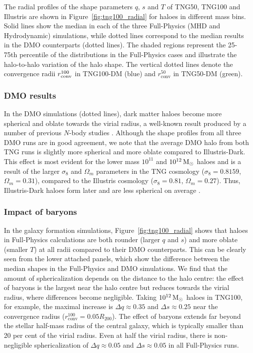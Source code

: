 \documentclass[fleqn,usenatbib]{mnras}
\def\msun{\,\rm M_{\odot}}
\begin{document}
The radial profiles of the shape parameters $q$, $s$ and $T$ of TNG50, TNG100 and Illustris are shown in Figure~\ref{fig:tng100_radial} for haloes in different mass bins.
Solid lines show the median in each of the three Full-Physics (MHD and Hydrodynamic) simulations, while dotted lines correspond to the median results in the DMO counterparts (dotted lines).  
The shaded regions represent the 25-75th percentile of the distributions in the Full-Physics cases and illustrate the halo-to-halo variation of the halo shape.
The vertical dotted lines denote the convergence radii $r_{\rm conv}^{100}$ in TNG100-DM (blue) and $r_\text{conv}^{50}$ in TNG50-DM (green).


\subsubsection*{DMO results}

In the DMO simulations (dotted lines), dark matter haloes become more spherical and oblate towards the virial radius, a well-known result produced by a number of previous $N$-body studies \citep[e.g.][]{Allgood06v367,Hayashi07v377,Vera-Ciro2011}.
Although the shape profiles from all three DMO runs are in good agreement, we note that the average DMO halo from both TNG runs is slightly more spherical and more oblate compared to Illustris-Dark.
This effect is most evident for the lower mass $10^{11}$ and $10^{12} \msun$ haloes and is a result of the larger $\sigma_8$ and $\Omega_m$ parameters in the TNG cosmology ($\sigma_8=0.8159$, $\Omega_m=0.31$), compared to the  Illustris cosmology ($\sigma_8=0.81$, $\Omega_m=0.27$).
Thus, Illustris-Dark haloes form later and are less spherical on average \citep{Allgood06v367, Maccio08v391}.

\subsubsection*{Impact of baryons}
In the galaxy formation simulations, Figure~\ref{fig:tng100_radial} shows that haloes in Full-Physics calculations are both rounder (larger $q$ and $s$) and more oblate (smaller $T$) at all radii compared to their DMO counterparts.
This can be clearly seen from the lower attached panels, which show the difference between the median shapes in the Full-Physics and DMO simulations.
We find that the amount of sphericalization depends on the distance to the halo centre: 
the effect of baryons is the largest near the halo centre but reduces towards the virial radius, where differences become negligible.
Taking $10^{12} \msun$ haloes in TNG100, for example, the maximal increase is $\Delta q \approx 0.35$ and $\Delta s \approx 0.25$ near the convergence radius ($r_\text{conv}^{100} = 0.05 R_{200}$). 
The effect of baryons extends far beyond the stellar half-mass radius of the central galaxy, which is typically smaller than 20 per cent of the virial radius.
Even at half the virial radius, there is non-negligible sphericalization of $\Delta q \approx 0.05$ and $\Delta s \approx 0.05$ in all Full-Physics runs.
\end{document}
